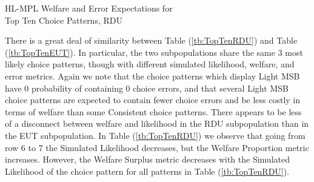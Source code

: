 \documentclass[../main.tex]{subfiles}
\begin{document}
\begin{table}[ht]
	\centering
	\caption{HL-MPL Welfare and Error Expectations for\\Top Ten Choice Patterns, RDU}
	\label{tb:TopTenRDU}
	\begin{adjustbox}{width=1\textwidth}
	\end{adjustbox}
\end{table}

There is a great deal of similarity between Table (\ref{tb:TopTenRDU}) and Table (\ref{tb:TopTenEUT}).
In particular, the two subpopulations share the same $3$ most likely choice patterns, though with different simulated likelihood, welfare, and error metrics.
Again we note that the choice patterns which display Light MSB have $0$ probability of containing $0$ choice errors, and that several Light MSB choice patterns are expected to contain fewer choice errors and be less costly in terms of welfare than some Consistent choice patterns.
There appears to be less of a disconnect between welfare and likelihood in the RDU subpopulation than in the EUT subpopulation. 
In Table (\ref{tb:TopTenRDU}) we observe that going from row 6 to 7 the Simulated Likelihood decreases, but the Welfare Proportion metric increases.
However, the Welfare Surplus metric decreases with the Simulated Likelihood of the choice pattern for all patterns in Table (\ref{tb:TopTenRDU}).
\end{document}
